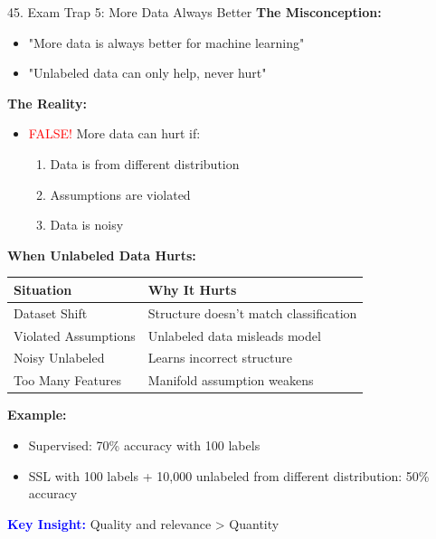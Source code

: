 \documentclass[8pt]{beamer}
\begin{document}
	\begin{frame}{45. Exam Trap 5: More Data Always Better}
		\fontsize{6.5}{7.5}\selectfont
		\textbf{The Misconception:}
		\begin{itemize}
			\item "More data is always better for machine learning"
			\item "Unlabeled data can only help, never hurt"
		\end{itemize}
		
		\textbf{The Reality:}
		\begin{itemize}
			\item \textcolor{red}{FALSE!} More data can hurt if:
			\begin{enumerate}
				\item Data is from different distribution
				\item Assumptions are violated
				\item Data is noisy
			\end{enumerate}
		\end{itemize}
		
		\textbf{When Unlabeled Data Hurts:}
		
		\begin{tabular}{|p{3.0cm}|p{4.0cm}|}
			\hline
			\textbf{Situation} & \textbf{Why It Hurts} \\
			\hline
			Dataset Shift & Structure doesn't match classification \\
			\hline
			Violated Assumptions & Unlabeled data misleads model \\
			\hline
			Noisy Unlabeled & Learns incorrect structure \\
			\hline
			Too Many Features & Manifold assumption weakens \\
			\hline
		\end{tabular}
		
		\textbf{Example:}
		\begin{itemize}
			\item Supervised: 70\% accuracy with 100 labels
			\item SSL with 100 labels + 10,000 unlabeled from different distribution: 50\% accuracy
		\end{itemize}
		
		\textcolor{blue}{\textbf{Key Insight:}} Quality and relevance > Quantity
	\end{frame}
	
\end{document}
